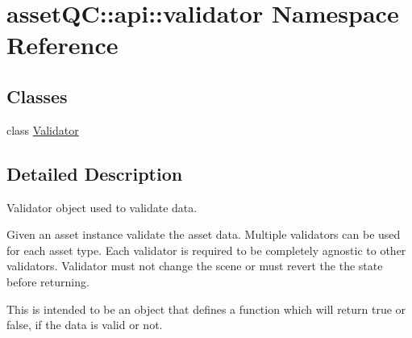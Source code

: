 \hypertarget{namespaceassetQC_1_1api_1_1validator}{\section{asset\-Q\-C\-:\-:api\-:\-:validator \-Namespace \-Reference}
\label{d7/d4e/namespaceassetQC_1_1api_1_1validator}
}
\subsection*{\-Classes}
\begin{DoxyCompactItemize}
\item 
class \hyperlink{classassetQC_1_1api_1_1validator_1_1Validator}{\-Validator}
\end{DoxyCompactItemize}


\subsection{\-Detailed \-Description}
\begin{DoxyVerb}
Validator object used to validate data.

Given an asset instance validate the asset data.
Multiple validators can be used for each asset type.
Each validator is required to be completely agnostic to other validators.
Validator must not change the scene or must revert the the state before returning.

This is intended to be an object that defines a function which will return
true or false, if the data is valid or not.

\end{DoxyVerb}
 